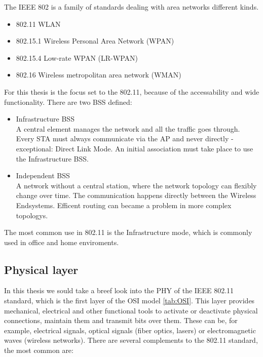The \ac{IEEE} 802 is a family of standards dealing with area networks different kinds.
\begin{itemize}
	\item 802.11 \ac{WLAN}
	\item 802.15.1 Wireless Personal Area Network (WPAN)
	\item 802.15.4 Low-rate WPAN (LR-WPAN)
	\item 802.16 Wireless metropolitan area network (WMAN)
\end{itemize}

For this thesis is the focus set to the 802.11, because of the accessability and wide functionality.
There are two \ac{BSS} defined:
\begin{itemize}
	\label{itm:bss}
	\item Infrastructure BSS\\
	A central element manages the network and all the traffic goes through. 
	Every \ac{STA} must always communicate via the \ac{AP} and never directly - exceptional: Direct Link Mode.
	An initial association must take place to use the Infrastructure \ac{BSS}.
	
	\item Independent BSS\\
	A network without a central station, where the network topology can flexibly change over time.
	The communication happens directly between the Wireless Endsystems.
	Efficent routing can became a problem in more complex topologys.
\end{itemize}
The most common use in 802.11 is the Infrastructure mode, which is commonly used in office and home enviroments.\\ 

\subsection*{Physical layer}

In this thesis we sould take a breef look into the \ac{PHY} of the IEEE 802.11 standard, which is the first layer of the OSI model \ref{tab:OSI}.
This layer provides mechanical, electrical and other functional tools to activate or deactivate physical connections, maintain them and transmit bits over them. 
These can be, for example, electrical signals, optical signals (fiber optics, lasers) or electromagnetic waves (wireless networks).
There are several complements to the 802.11 standard, the most common are:

